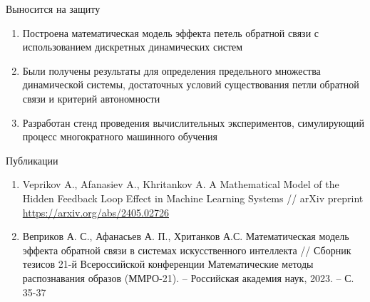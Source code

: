 \documentclass[aspectratio=169]{beamer}
\begin{document}
\begin{frame}{Выносится на защиту}
    \begin{enumerate}
        \item Построена математическая модель эффекта петель обратной связи с использованием дискретных динамических систем
        \item Были получены результаты для определения предельного множества динамической системы, достаточных условий существования петли обратной связи и критерий автономности
        \item Разработан стенд проведения вычислительных экспериментов, симулирующий процесс многократного машинного обучения
    \end{enumerate}
    \begin{block}{Публикации}%
    \footnotesize 
    \begin{enumerate}
        \item Veprikov A.,   Afanasiev A., Khritankov A. A Mathematical Model of the Hidden Feedback Loop Effect in Machine Learning Systems // arXiv preprint \url{https://arxiv.org/abs/2405.02726}
        \item Веприков А. С., Афанасьев А. П., Хританков А.С. Математическая модель эффекта обратной связи в системах искусственного интеллекта // Сборник тезисов 21-й Всероссийской конференции Математические методы распознавания образов (ММРО-21). – Российская академия наук, 2023. – С. 35-37 
    \end{enumerate}
    \end{block}
\end{frame}
\end{document}

